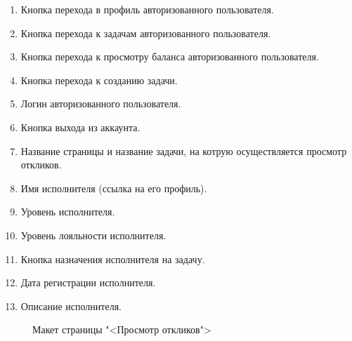 \begin{enumerate}
	\item Кнопка перехода в профиль авторизованного пользователя.
	\item Кнопка перехода к задачам авторизованного пользователя.
	\item Кнопка перехода к просмотру баланса авторизованного пользователя.
	\item Кнопка перехода к созданию задачи.
	\item Логин авторизованного пользователя.
	\item Кнопка выхода из аккаунта.
	\item Название страницы и название задачи, на котрую осуществляется просмотр откликов.
	\item Имя исполнителя (ссылка на его профиль).
	\item Уровень исполнителя.
	\item Уровень лояльности исполнителя.
	\item Кнопка назначения исполнителя на задачу.
	\item Дата регистрации исполнителя.
	\item Описание исполнителя.
\end{enumerate}

\begin{figure}[ht]
	\caption{Макет страницы "<Просмотр откликов">}
	\label{m8:image}
\end{figure}